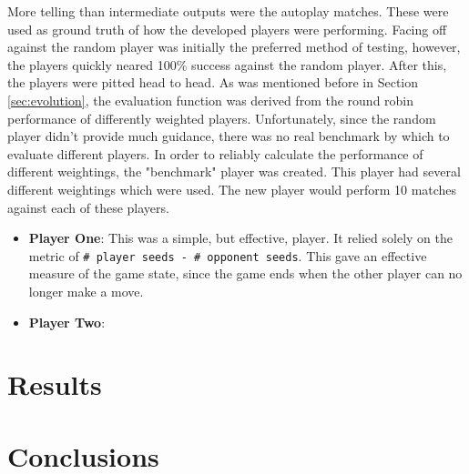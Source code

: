 \documentclass[]{article}
\begin{document}
More telling than intermediate outputs were the autoplay matches. These were used as ground truth of how the developed players were performing. Facing off against the random player was initially the preferred method of testing, however, the players quickly neared 100\% success against the random player. After this, the players were pitted head to head. As was mentioned before in Section \ref{sec:evolution}, the evaluation function was derived from the round robin performance of differently weighted players. Unfortunately, since the random player didn't provide much guidance, there was no real benchmark by which to evaluate different players. In order to reliably calculate the performance of different weightings, the "benchmark" player was created. This player had several different weightings which were used. The new player would perform 10 matches against each of these players. 

\begin{itemize}
\item \textbf{Player One}: This was a simple, but effective, player. It relied solely on the metric of \texttt{# player seeds - # opponent seeds}. This gave an effective measure of the game state, since the game ends when the other player can no longer make a move.
\item \textbf{Player Two}: 
\end{itemize}


\section{Results}


\section{Conclusions}





\end{document}
